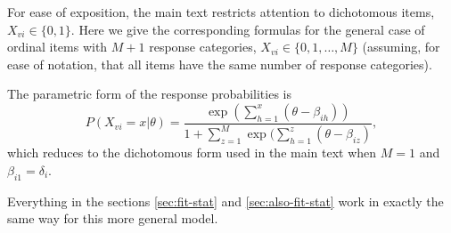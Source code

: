 For ease of exposition, the main text restricts attention to dichotomous items, $X_{vi}\in\{0,1\}$. Here we give the corresponding formulas for the general case of ordinal items with $M+1$ response categories, $X_{vi}\in\{0,1,\ldots,M\}$ (assuming, for ease of notation, that all items have the same number of response categories).

The parametric form of the response probabilities is
$$
P(X_{vi}=x|\theta)=\frac{\exp(\sum_{h=1}^x(\theta-\beta_{ih}))}{1+\sum_{z=1}^M\exp(\sum_{h=1}^z(\theta-\beta_{iz})},
$$
which reduces to the dichotomous form used in the main text when $M=1$ and $\beta_{i1}=\delta_i$.

Everything in the sections \ref{sec:fit-stat} and \ref{sec:also-fit-stat} work in exactly the same way for this more general model.


